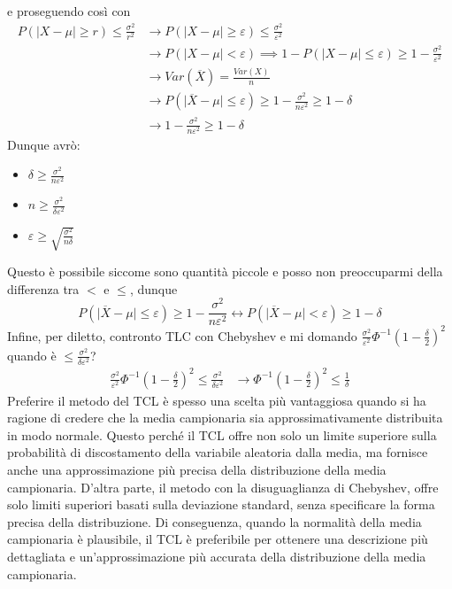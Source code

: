 \documentclass[11pt]{report}
\begin{document}
e proseguendo così con
\begin{equation}
    \begin{split}
        P \left( \mid X - \mu \mid \geq r \right) \leq \frac{\sigma^2}{r^2} & \rightarrow P \left( \mid X - \mu \mid \geq \varepsilon \right) \leq \frac{\sigma^2}{\varepsilon^2}\\
        & \rightarrow P \left( \mid X - \mu \mid < \varepsilon \right) \implies 1 - P \left( \mid X - \mu \mid \leq \varepsilon \right) \geq 1 - \frac{\sigma^2}{\varepsilon^2}\\
        & \rightarrow Var \left( \overline{X} \right) = \frac{Var(X)}{n}\\
        & \rightarrow P \left( \mid \overline{X} - \mu \mid \leq \varepsilon \right) \geq 1 - \frac{\sigma^2}{n\varepsilon^2} \geq 1 - \delta\\
        & \rightarrow 1 - \frac{\sigma^2}{n\varepsilon^2} \geq 1 - \delta
    \end{split}
\end{equation}
Dunque avrò:
\begin{itemize}
    \item $\delta \geq \frac{\sigma^2}{n\varepsilon^2}$
    \item $n \geq \frac{\sigma^2}{\delta\varepsilon^2}$
    \item $\varepsilon \geq \sqrt{\frac{\sigma^2}{n\delta}}$
\end{itemize}
Questo è possibile siccome sono quantità piccole e posso non preoccuparmi della differenza tra $<$ e $\leq$, dunque
\begin{equation}
	P \left( \mid \overline{X} - \mu \mid \leq \varepsilon \right) \geq 1 - \frac{\sigma^2}{n\varepsilon^2} \longleftrightarrow P \left( \mid \overline{X} - \mu \mid < \varepsilon \right) \geq 1 - \delta
\end{equation}
Infine, per diletto, contronto TLC con Chebyshev e mi domando $\frac{\sigma^2}{\varepsilon^2} \Phi^{-1} \left( 1 - \frac{\delta}{2} \right)^2$ quando è $\leq \frac{\sigma^2}{\delta\varepsilon^2}$?
\begin{equation}
    \begin{split}
        \frac{\sigma^2}{\varepsilon^2} \Phi^{-1} \left( 1 - \frac{\delta}{2} \right)^2 \leq \frac{\sigma^2}{\delta\varepsilon^2} & \rightarrow \Phi^{-1} \left( 1 - \frac{\delta}{2} \right)^2 \leq \frac{1}{\delta}
    \end{split}
\end{equation}
Preferire il metodo del TCL è spesso una scelta più vantaggiosa quando si ha ragione di credere che la media campionaria sia approssimativamente distribuita in modo normale. Questo perché il TCL offre non solo un limite superiore sulla probabilità di discostamento della variabile aleatoria dalla media, ma fornisce anche una approssimazione più precisa della distribuzione della media campionaria. D'altra parte, il metodo con la disuguaglianza di Chebyshev, offre solo limiti superiori basati sulla deviazione standard, senza specificare la forma precisa della distribuzione. Di conseguenza, quando la normalità della media campionaria è plausibile, il TCL è preferibile per ottenere una descrizione più dettagliata e un'approssimazione più accurata della distribuzione della media campionaria.
\end{document}
